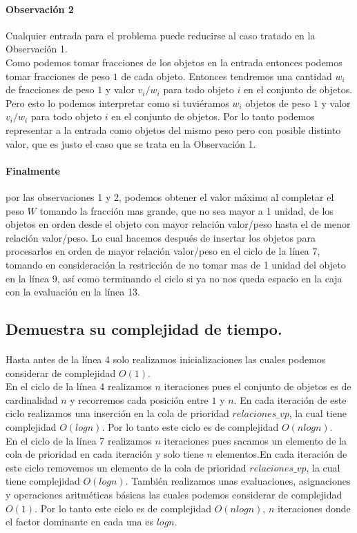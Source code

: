 \documentclass[12pt]{article}
\begin{document}
\paragraph{Observación 2} Cualquier entrada para el problema puede reducirse al caso tratado en la Observación 1.\\
Como podemos tomar fracciones de los objetos en la entrada entonces podemos tomar fracciones de peso $1$ de cada objeto. Entonces tendremos una cantidad $w_i$ de fracciones de peso $1$ y valor $v_i/w_i$ para todo objeto $i$ en el conjunto de objetos. Pero esto lo podemos interpretar como si tuviéramos $w_i$ objetos de peso $1$ y valor $v_i/w_i$ para todo objeto $i$ en el conjunto de objetos. Por lo tanto podemos representar a la entrada como objetos del mismo peso pero con posible distinto valor, que es justo el caso que se trata en la Observación 1.
\paragraph{Finalmente} por las observaciones 1 y 2, podemos obtener el valor máximo al completar el peso $W$ tomando la fracción mas grande, que no sea mayor a 1 unidad, de los objetos en orden desde el objeto con mayor relación valor/peso hasta el de menor relación valor/peso. Lo cual hacemos después de insertar los objetos para procesarlos en orden de mayor relación valor/peso en el ciclo de la línea 7, tomando en consideración la restricción de no tomar mas de 1 unidad del objeto en la línea 9, así como terminando el ciclo si ya no nos queda espacio en la caja con la evaluación en la línea 13.
\subsection{Demuestra su complejidad de tiempo.}
 \paragraph{} Hasta antes de la línea 4 solo realizamos inicializaciones las cuales podemos considerar de complejidad $O(1)$.\\
 En el ciclo de la línea 4 realizamos $n$ iteraciones pues el conjunto de objetos es de cardinalidad $n$ y recorremos cada posición entre $1$ y $n$. En cada iteración de este ciclo realizamos una inserción en la cola de prioridad $relaciones\_vp$, la cual tiene complejidad $O(logn)$. Por lo tanto este ciclo es de complejidad $O(nlogn)$.\\ 
 En el ciclo de la línea 7 realizamos $n$ iteraciones pues sacamos un elemento de la cola de prioridad en cada iteración y solo tiene $n$ elementos.En cada iteración de este ciclo removemos un elemento de la cola de prioridad $relaciones\_vp$, la cual tiene complejidad $O(logn)$. También realizamos unas evaluaciones, asignaciones y operaciones aritméticas básicas las cuales podemos considerar de complejidad $O(1)$. Por lo tanto este ciclo es de complejidad $O(nlogn)$, $n$ iteraciones donde el factor dominante en cada una es $logn$. \\
 
\end{document}
